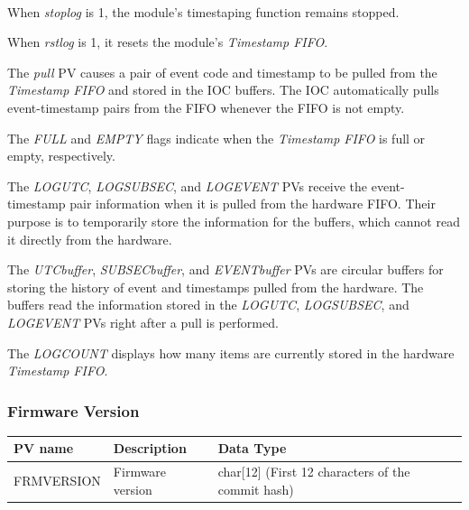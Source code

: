 \documentclass[openany]{article}
\begin{document}
			\paragraph{} When \emph{stoplog} is 1, the module's timestaping function remains stopped.
			\par When \emph{rstlog} is 1, it resets the module's \emph{Timestamp FIFO}.
			\par The \emph{pull} PV causes a pair of event code and timestamp to be pulled from the \emph{Timestamp FIFO} and stored in the IOC buffers. The IOC automatically pulls event-timestamp pairs from the FIFO whenever the FIFO is not empty.
			\par The \emph{FULL} and \emph{EMPTY} flags indicate when the \emph{Timestamp FIFO} is full or empty, respectively.
			\par The \emph{LOGUTC}, \emph{LOGSUBSEC}, and \emph{LOGEVENT} PVs receive the event-timestamp pair information when it is pulled from the hardware FIFO. Their purpose is to temporarily store the information for the buffers, which cannot read it directly from the hardware.
			\par The \emph{UTCbuffer}, \emph{SUBSECbuffer}, and \emph{EVENTbuffer} PVs are circular buffers for storing the history of event and timestamps pulled from the hardware. The buffers read the information stored in the \emph{LOGUTC}, \emph{LOGSUBSEC}, and \emph{LOGEVENT} PVs right after a pull is performed.
			\par The \emph{LOGCOUNT} displays how many items are currently stored in the hardware \emph{Timestamp FIFO}.

			\bigskip
			\setlength{\fboxsep}{8pt}

		\subsubsection{Firmware Version}\label{pvgroup:evre-firmware-version}
			\begin{center}
			\begin{tabular}{| m{2.8cm} m{6cm} m{6cm} |}
			    \hline
			    \bfseries PV name & \bfseries Description & \bfseries Data Type \\ \hline
			    FRMVERSION & Firmware version & char[12] (First 12 characters of the commit hash) \\ \hline
			\end{tabular}
			\end{center}
\end{document}
